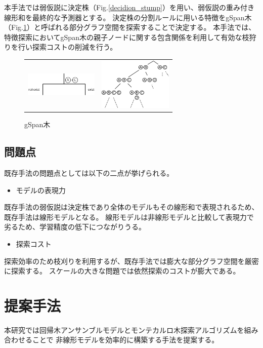 \documentclass[a4paper,10.5pt]{jsarticle}           %
\begin{document}
本手法では弱仮説に決定株（Fig.\ref{decidion_stump}）を用い、弱仮説の重み付き線形和を最終的な予測器とする。
決定株の分割ルールに用いる特徴をgSpan木（Fig.\ref{search_tree}）と呼ばれる部分グラフ空間を探索することで決定する。
本手法では、特徴探索においてgSpan木の親子ノードに関する包含関係を利用して有効な枝狩りを行い探索コストの削減を行う。
\begin{figure}[h]
\begin{tabular}{cc}
\begin{minipage}[t]{0.44\hsize}
\centering
\includegraphics[width=35mm]{img/decidion_stump.eps}
\caption{決定株}
\label{decidion_stump}
\end{minipage} &
\begin{minipage}[t]{0.44\hsize}
\centering
\includegraphics[width=35mm]{img/graph_search_tree.eps}
\caption{gSpan木}
\label{search_tree}
\end{minipage}
\end{tabular}
\end{figure}

\subsection{問題点}
既存手法の問題点としては以下の二点が挙げられる。
\begin{itemize}
	\item モデルの表現力
\end{itemize}
既存手法の弱仮説は決定株であり全体のモデルもその線形和で表現されるため、
既存手法は線形モデルとなる。
線形モデルは非線形モデルと比較して表現力で劣るため、学習精度の低下につながりうる。
\begin{itemize}
	\item 探索コスト
\end{itemize}
探索効率のため枝刈りを利用するが、既存手法では膨大な部分グラフ空間を厳密に探索する。
スケールの大きな問題では依然探索のコストが膨大である。

\section{提案手法}
本研究では回帰木アンサンブルモデルとモンテカルロ木探索アルゴリズムを組み合わせることで
非線形モデルを効率的に構築する手法を提案する。
\end{document}
